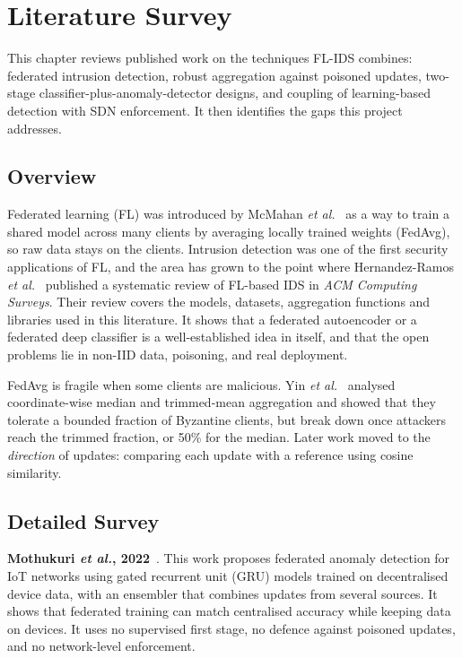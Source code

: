\chapter{Literature Survey}
This chapter reviews published work on the techniques FL-IDS combines: federated intrusion detection, robust aggregation against poisoned updates, two-stage classifier-plus-anomaly-detector designs, and coupling of learning-based detection with SDN enforcement. It then identifies the gaps this project addresses.

\section{Overview}
Federated learning (FL) was introduced by McMahan \emph{et al.}~\cite{mcmahan2017fedavg} as a way to train a shared model across many clients by averaging locally trained weights (FedAvg), so raw data stays on the clients. Intrusion detection was one of the first security applications of FL, and the area has grown to the point where Hernandez-Ramos \emph{et al.}~\cite{hernandez2025fliids} published a systematic review of FL-based IDS in \emph{ACM Computing Surveys}. Their review covers the models, datasets, aggregation functions and libraries used in this literature. It shows that a federated autoencoder or a federated deep classifier is a well-established idea in itself, and that the open problems lie in non-IID data, poisoning, and real deployment.

FedAvg is fragile when some clients are malicious. Yin \emph{et al.}~\cite{yin2018trimmed} analysed coordinate-wise median and trimmed-mean aggregation and showed that they tolerate a bounded fraction of Byzantine clients, but break down once attackers reach the trimmed fraction, or 50\% for the median. Later work moved to the \emph{direction} of updates: comparing each update with a reference using cosine similarity.

\section{Detailed Survey}

\textbf{Mothukuri \emph{et al.}, 2022}~\cite{mothukuri2022fl}. This work proposes federated anomaly detection for IoT networks using gated recurrent unit (GRU) models trained on decentralised device data, with an ensembler that combines updates from several sources. It shows that federated training can match centralised accuracy while keeping data on devices. It uses no supervised first stage, no defence against poisoned updates, and no network-level enforcement.


